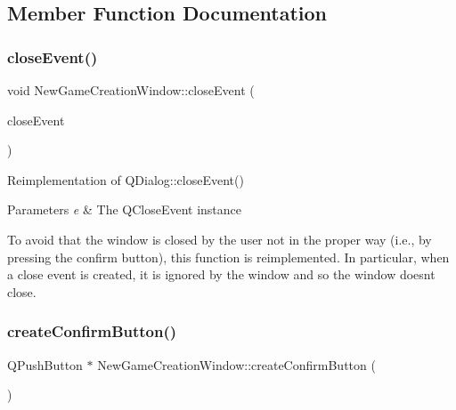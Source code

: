 \subsection{Member Function Documentation}
\mbox{\label{classNewGameCreationWindow_ad96277fa809e77e33ade1a93fc4af5d7}} 
\subsubsection{\texorpdfstring{close\+Event()}{closeEvent()}}
{\footnotesize\ttfamily void New\+Game\+Creation\+Window\+::close\+Event (\begin{DoxyParamCaption}\item[{Q\+Close\+Event $\ast$}]{close\+Event }\end{DoxyParamCaption})\hspace{0.3cm}{\ttfamily [protected]}}



Reimplementation of Q\+Dialog\+::close\+Event() 


\begin{DoxyParams}{Parameters}
{\em e} & The Q\+Close\+Event instance\\
\hline
\end{DoxyParams}
To avoid that the window is closed by the user not in the proper way (i.\+e., by pressing the confirm button), this function is reimplemented. In particular, when a close event is created, it is ignored by the window and so the window doesn\textquotesingle{}t close. \mbox{\label{classNewGameCreationWindow_aaa0b36302cf67c363da723e64c92c777}} 
\subsubsection{\texorpdfstring{create\+Confirm\+Button()}{createConfirmButton()}}
{\footnotesize\ttfamily Q\+Push\+Button $\ast$ New\+Game\+Creation\+Window\+::create\+Confirm\+Button (\begin{DoxyParamCaption}{ }\end{DoxyParamCaption})\hspace{0.3cm}{\ttfamily [protected]}}



